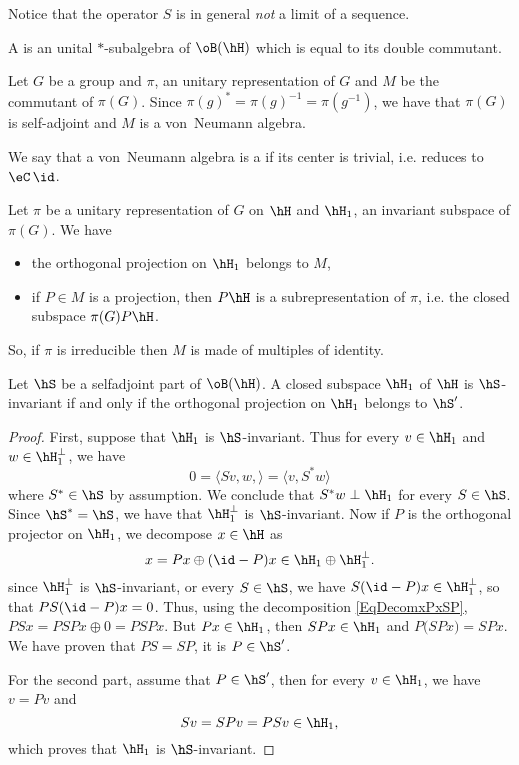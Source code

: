 Notice that the operator $S$ is in general \emph{not} a limit of a sequence.

\begin{definition}
A  is an unital $*$-subalgebra of $\oB(\hH)$ which is equal to its double commutant.
\end{definition}

Let $G$ be a group and $\pi$, an unitary representation of $G$ and $M$ be the commutant of $\pi(G)$. Since $\pi(g)^*=\pi(g)^{-1}=\pi(g^{-1})$, we have that $\pi(G)$ is self-adjoint and $M$ is a von~Neumann algebra.

We say that a von~Neumann algebra is a  if its center is trivial, i.e. reduces to $\eC\,\id$.

\begin{proposition}	\label{PropprojrepresVN}
Let $\pi$ be a unitary representation of $G$ on $\hH$ and $\hH_1$, an invariant subspace of $\pi(G)$. We have
\begin{itemize}
\item the orthogonal projection on $\hH_1$ belongs to $M$,
\item if $P\in M$ is a projection, then $P\hH$ is a subrepresentation of $\pi$, i.e. the closed subspace $\pi(G)P\hH$.
\end{itemize}
\end{proposition}
So, if $\pi$ is irreducible then $M$ is made of multiples of identity.

\begin{lemma}		\label{LeminvarMprime}
Let $\hS$ be a selfadjoint part of $\oB(\hH)$. A closed subspace $\hH_1$ of $\hH$ is $\hS$-invariant if and only if the orthogonal projection on $\hH_1$ belongs to $\hS'$.
\end{lemma}

\begin{proof}
First, suppose that $\hH_1$ is $\hS$-invariant. Thus for every $v\in\hH_1$ and $w\in \hH_1^{\perp}$, we have
\[ 
  0=\langle Sv,w, \rangle =\langle v, S^*w\rangle 
\]
where $S^*\in\hS$ by assumption. We conclude that $S^*w\perp\hH_1$ for every $S\in\hS$. Since $\hS^*=\hS$, we have that $\hH_1^{\perp}$ is $\hS$-invariant. Now if $P$ is the orthogonal projector on $\hH_1$, we decompose $x\in\hH$ as
\begin{equation}		\label{EqDecomxPxSP}
  x=Px\oplus(\id-P)x\in\hH_1\oplus\hH_1^{\perp}.
\end{equation}
since $\hH_1^{\perp}$ is $\hS$-invariant, or every $S\in\hS$, we have $S(\id-P)x\in\hH_1^{\perp}$, so that $PS(\id-P)x=0$. Thus, using the decomposition \eqref{EqDecomxPxSP}, $PSx=PSPx\oplus 0=PSPx$. But $Px\in \hH_1$, then $SPx\in\hH_1$ and $P\big( SPx \big)=SPx$. We have proven that $PS=SP$, it is $P\in\hS'$.

For the second part, assume that $P\in\hS'$, then for every $v\in\hH_1$, we have $v=Pv$ and
\[ 
  Sv=SPv=PSv\in\hH_1,
\]
which proves that $\hH_1$ is $\hS$-invariant.
\end{proof}


